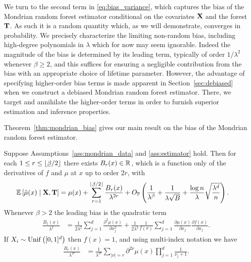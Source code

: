 We turn to the second term in \eqref{eq:bias_variance}, which captures the bias
of the Mondrian random forest estimator conditional on the covariates $\mathbf{X}$ and
the forest $\mathbf{T}$. As such it is a random quantity which, as we will
demonstrate, converges in probability. We precisely characterize the limiting
non-random bias, including high-degree polynomials in $\lambda$ which for now
may seem ignorable. Indeed the magnitude of the bias is determined by its
leading term, typically of order $1/\lambda^2$ whenever $\beta \geq 2$, and
this suffices for ensuring a negligible contribution from the bias with an
appropriate choice of lifetime parameter. However, the advantage of specifying
higher-order bias terms is made apparent in Section~\ref{sec:debiased} when we
construct a debiased Mondrian random forest estimator. There, we target and
annihilate the higher-order terms in order to furnish superior estimation and
inference properties.

Theorem~\ref{thm:mondrian_bias} gives our main result on
the bias of the Mondrian random forest estimator.

\begin{theorem}%
  \label{thm:mondrian_bias}
  Suppose Assumptions~\ref{ass:mondrian_data} and \ref{ass:estimator} hold.
  Then for each $1 \leq r \leq \lfloor \flbeta / 2 \rfloor$ there exists
  $B_r(x) \in \mathbb{R}$, which is a function only of
  the derivatives of $f$ and $\mu$ at $x$ up to order $2r$, with
  \begin{align*}
    \E \left[ \hat \mu(x) \mid \bX, \bT \right]
    &=
    \mu(x)
    + \sum_{r=1}^{\lfloor \flbeta / 2 \rfloor}
    \frac{B_r(x)}{\lambda^{2r}}
    + O_\P \left(
      \frac{1}{\lambda^\beta}
      + \frac{1}{\lambda \sqrt B}
      + \frac{\log n}{\lambda} \sqrt{\frac{\lambda^d}{n}}
    \right).
  \end{align*}
  Whenever $\beta > 2$ the leading bias is the quadratic term
  \begin{align*}
    \frac{B_1(x)}{\lambda^2}
    &=
    \frac{1}{2 \lambda^2}
    \sum_{j=1}^d \frac{\partial^2 \mu(x)}{\partial x_j^2}
    + \frac{1}{2 \lambda^2}
    \frac{1}{f(x)}
    \sum_{j=1}^{d} \frac{\partial \mu(x)}{\partial x_j}
    \frac{\partial f(x)}{\partial x_j}.
  \end{align*}
  If $X_i \sim \operatorname{Unif}\big([0,1]^d\big)$ then $f(x) = 1$,
  and using multi-index notation we have
  \begin{align*}
    \frac{B_r(x)}{\lambda^{2r}}
    &=
    \frac{1}{\lambda^{2r}} \sum_{|\nu|=r} \partial^{2 \nu} \mu(x)
    \prod_{j=1}^d \frac{1}{\nu_j + 1}.
  \end{align*}
\end{theorem}

